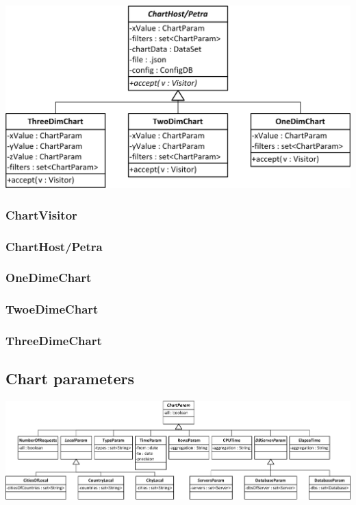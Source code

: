 \begin{center}
\includegraphics{Pictures/Parts/Petra.png}
\end{center}  
\subsubsection*{ChartVisitor}
\subsubsection*{ChartHost/Petra}
\subsubsection*{OneDimeChart}
\subsubsection*{TwoeDimeChart}
\subsubsection*{ThreeDimeChart} 


\subsection{Chart parameters}
\begin{center}
\includegraphics[width=1\linewidth]{Pictures/Parts/ChartPara.png}
\end{center}  
